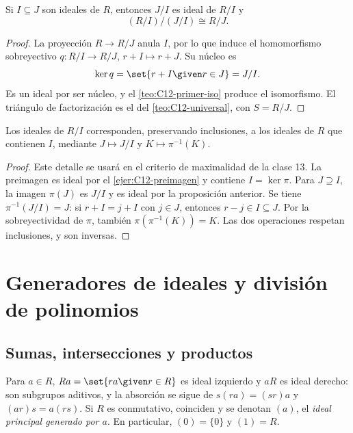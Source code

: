 \begin{prop}\label{prop:C12-tercer-iso}
Si $I\subseteq J$ son ideales de $R$, entonces $J/I$ es ideal de $R/I$ y
\[
(R/I)/(J/I)\cong R/J.
\]
\end{prop}
\begin{proof}
La proyección $R\to R/J$ anula $I$, por lo que induce el homomorfismo sobreyectivo $q:R/I\to R/J$, $r+I\mapsto r+J$. Su núcleo es
\[
\ker q=\set{r+I\given r\in J}=J/I.
\]
Es un ideal por ser núcleo, y el \cref{teo:C12-primer-iso} produce el isomorfismo. El triángulo de factorización es el del \cref{teo:C12-universal}, con $S=R/J$.
\end{proof}

\begin{lema}\label{lema:C12-correspondencia}
Los ideales de $R/I$ corresponden, preservando inclusiones, a los ideales de $R$ que contienen $I$, mediante $J\mapsto J/I$ y $K\mapsto\pi^{-1}(K)$.
\end{lema}
\begin{proof}
Este detalle se usará en el criterio de maximalidad de la clase 13. La preimagen es ideal por el \cref{ejer:C12-preimagen} y contiene $I=\ker\pi$. Para $J\supseteq I$, la imagen $\pi(J)$ es $J/I$ y es ideal por la proposición anterior. Se tiene $\pi^{-1}(J/I)=J$: si $r+I=j+I$ con $j\in J$, entonces $r-j\in I\subseteq J$. Por la sobreyectividad de $\pi$, también $\pi(\pi^{-1}(K))=K$. Las dos operaciones respetan inclusiones, y son inversas.
\end{proof}

\section{Generadores de ideales y división de polinomios}
\subsection{Sumas, intersecciones y productos}
Para $a\in R$, $Ra=\set{ra\given r\in R}$ es ideal izquierdo y $aR$ es ideal derecho: son subgrupos aditivos, y la absorción se sigue de $s(ra)=(sr)a$ y $(ar)s=a(rs)$. Si $R$ es conmutativo, coinciden y se denotan $(a)$, el \emph{ideal principal generado por $a$}. En particular, $(0)=\{0\}$ y $(1)=R$.


